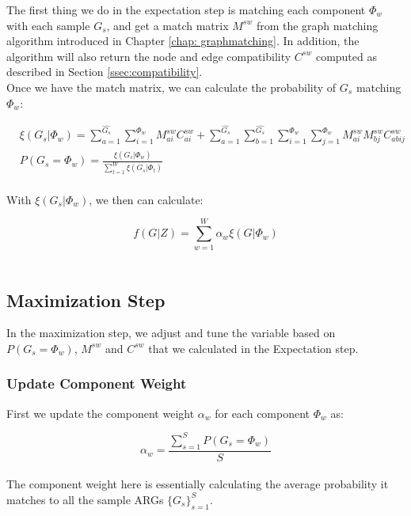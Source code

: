 The first thing we do in the expectation step is matching each component $\Phi_w$ with each sample $G_s$, and get a match matrix $M^{sw}$ from the graph matching algorithm introduced in Chapter \ref{chap: graphmatching}. In addition, the algorithm will also return the node and edge compatibility $C^{sw}$ computed as described in Section \ref{ssec:compatibility}.\\

Once we have the match matrix, we can calculate the probability of $G_s$ matching $\Phi_w$:

\begin{align} 
& \xi(G_s|\Phi_w)=\sum_{a=1}^{\widehat{G_s}}\sum_{i=1}^{\Phi_w}M^{sw}_{ai}C^{sw}_{ai}+ \sum_{a=1}^{\widehat{G_s}}\sum_{b=1}^{\widehat{G_s}}\sum_{i=1}^{\Phi_w}\sum_{j=1}^{\Phi_w}M^{sw}_{ai}M^{sw}_{bj}C^{sw}_{abij}\\
& P(G_s=\Phi_w)=\frac{\xi(G_s|\Phi_w)}{\sum_{t=1}^{W}\xi(G_s|\Phi_t)}
\end{align}\\

With $\xi(G_s|\Phi_w)$, we then can calculate:

\begin{equation} 
f(G|Z) = \sum_{w=1}^W\alpha_w\xi(G|\Phi_w) \label{eq:fgz}
\end{equation}\\

\subsection{Maximization Step}

In the maximization step, we adjust and tune the variable based on $P(G_s=\Phi_w)$, $M^{sw}$ and $C^{sw}$ that we calculated in the Expectation step.

\subsubsection{Update Component Weight}

First we update the component weight $\alpha_w$ for each component $\Phi_w$ as:

\begin{equation} 
\alpha_w=\frac{\sum^S_{s=1}P(G_s=\Phi_w)}{S}
\end{equation}\\

The component weight here is essentially calculating the average probability it matches to all the sample ARGs $\{G_s\}^S_{s=1}$.

